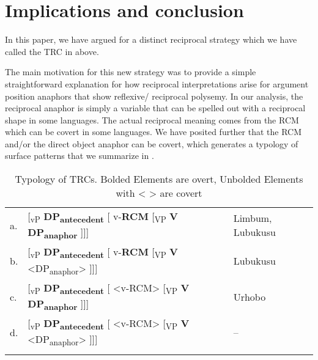 \documentclass[output=paper]{langsci/langscibook}
\begin{document}
\section{Implications and conclusion}

In this paper, we have argued for a distinct reciprocal strategy which we have called the TRC in  above. 

The main motivation for this new strategy was to provide a simple straightforward explanation for how reciprocal interpretations arise for argument position anaphors that show reflexive/ reciprocal polysemy. In our analysis, the reciprocal anaphor is simply a variable that can be spelled out with a reciprocal shape in some languages. The actual reciprocal meaning comes from the RCM which can be covert in some languages. We have posited further that the RCM and/or the direct object anaphor can be covert, which generates a typology of surface patterns that we summarize in .
 
\begin{table}
\caption{Typology of TRCs.     Bolded Elements are overt, Unbolded Elements with < > are covert}
\label{tab:1}

\begin{tabularx}{\textwidth}{llX}
\lsptoprule
a.&
[\textsubscript{vP} \textbf{DP\textsubscript{antecedent}} [ v-\textbf{RCM}   [\textsubscript{VP} \textbf{V}  \textbf{DP\textsubscript{anaphor}} ]]]
&Limbum, Lubukusu
\\
b.&
[\textsubscript{vP} \textbf{DP\textsubscript{antecedent}} [ v-\textbf{RCM}   [\textsubscript{VP} \textbf{V}  <DP\textsubscript{anaphor}> ]]]   &
Lubukusu  
\\
c.&  [\textsubscript{vP} \textbf{DP\textsubscript{antecedent}} [ <v-RCM>   [\textsubscript{VP} \textbf{V}  \textbf{DP\textsubscript{anaphor}} ]]]  &
Urhobo
\\
d. & [\textsubscript{vP} \textbf{DP\textsubscript{antecedent}} [ <v-RCM>   [\textsubscript{VP} \textbf{V}  <DP\textsubscript{anaphor}> ]]] &
--
\\
\lspbottomrule
\end{tabularx}
\end{table} 
\end{document}
